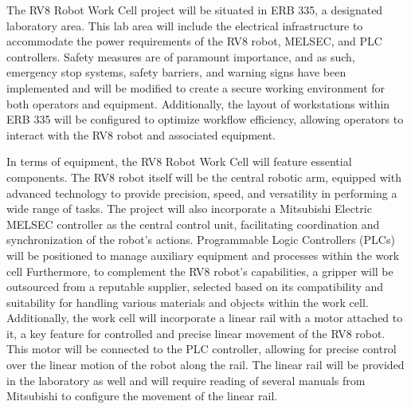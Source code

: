 The RV8 Robot Work Cell project will be situated in ERB 335, a designated laboratory area. This lab area will include the electrical infrastructure to accommodate the power requirements of the RV8 robot, MELSEC, and PLC controllers. Safety measures are of paramount importance, and as such, emergency stop systems, safety barriers, and warning signs have been implemented and will be modified to create a secure working environment for both operators and equipment. Additionally, the layout of workstations within ERB 335 will be configured to optimize workflow efficiency, allowing operators to interact with the RV8 robot and associated equipment.

In terms of equipment, the RV8 Robot Work Cell will feature essential components. The RV8 robot itself will be the central robotic arm, equipped with advanced technology to provide precision, speed, and versatility in performing a wide range of tasks. The project will also incorporate a Mitsubishi Electric MELSEC controller as the central control unit, facilitating  coordination and synchronization of the robot's actions. Programmable Logic Controllers (PLCs) will be  positioned to manage auxiliary equipment and processes within the work cell Furthermore, to complement the RV8 robot's capabilities, a gripper will be outsourced from a reputable supplier, selected based on its compatibility and suitability for handling various materials and objects within the work cell. Additionally, the work cell will incorporate a linear rail with a motor attached to it, a key feature for controlled and precise linear movement of the RV8 robot. This motor will be  connected to the PLC controller, allowing for precise control over the linear motion of the robot along the rail. The linear rail will be provided in the laboratory as well and will require reading of several manuals from Mitsubishi to configure the movement of the linear rail.
